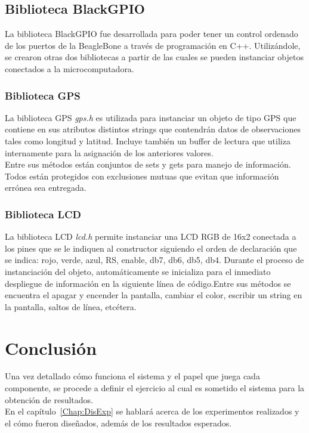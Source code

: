 \subsection{Biblioteca BlackGPIO}

La biblioteca BlackGPIO fue desarrollada para poder tener un control ordenado de los puertos de la BeagleBone a través de programación en C++. Utilizándole, se crearon otras dos bibliotecas a partir de las cuales se pueden instanciar objetos conectados a la microcomputadora.

\subsubsection{Biblioteca GPS}

La biblioteca GPS \textit{gps.h} es utilizada para instanciar un objeto de tipo GPS que contiene en sus atributos distintos strings que contendrán datos de observaciones tales como longitud y latitud. Incluye también un buffer de lectura que utiliza internamente para la asignación de los anteriores valores.\\

Entre sus métodos están conjuntos de sets y gets para manejo de información. Todos están protegidos con exclusiones mutuas que evitan que información errónea sea entregada.

\subsubsection{Biblioteca LCD}

La biblioteca LCD \textit{lcd.h} permite instanciar una LCD RGB de 16x2 conectada a los pines que se le indiquen al constructor siguiendo el orden de declaración que se indica: rojo, verde, azul, RS, enable, db7, db6, db5, db4. Durante el proceso de instanciación del objeto, automáticamente se inicializa para el inmediato despliegue de información en  la siguiente línea de código.Entre sus métodos se encuentra el apagar y encender la pantalla, cambiar el color, escribir un string en la pantalla, saltos de línea, etcétera.

\section{Conclusión}

Una vez detallado cómo funciona el sistema y el papel que juega cada componente, se procede a definir el ejercicio al cual es sometido el sistema para la obtención de resultados.\\
 
En el capítulo~\ref{Chap:DisExp} se hablará acerca de los experimentos realizados y el cómo fueron diseñados, además de los resultados esperados.